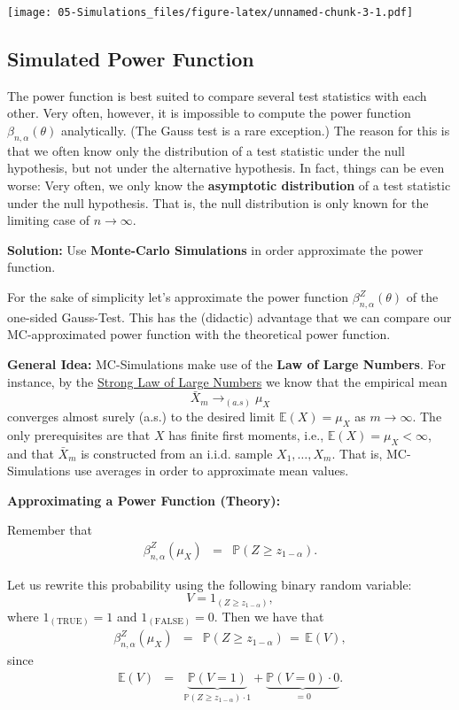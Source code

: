 \documentclass[]{book}
\theoremstyle{definition}
\theoremstyle{definition}
\theoremstyle{definition}
\theoremstyle{remark}
\begin{document}
\texttt{[image: 05-Simulations\_files/figure-latex/unnamed-chunk-3-1.pdf]}

\hypertarget{simulated-power-function}{%
\subsection{Simulated Power Function}\label{simulated-power-function}}

The power function is best suited to compare several test statistics with each other. Very often, however, it is impossible to compute the power function \(\beta_{n,\alpha}(\theta)\) analytically. (The Gauss test is a rare exception.) The reason for this is that we often know only the distribution of a test statistic under the null hypothesis, but not under the alternative hypothesis. In fact, things can be even worse: Very often, we only know the \textbf{asymptotic distribution} of a test statistic under the null hypothesis. That is, the null distribution is only known for the limiting case of \(n\to\infty\).

\textbf{Solution:}
Use \textbf{Monte-Carlo Simulations} in order approximate the power function.

For the sake of simplicity let's approximate the power function \(\beta^Z_{n,\alpha}(\theta)\) of the one-sided Gauss-Test. This has the (didactic) advantage that we can compare our MC-approximated power function with the theoretical power function.

\textbf{General Idea:}
MC-Simulations make use of the \textbf{Law of Large Numbers}. For instance, by the \href{http://www.statlect.com/asylln1.htm}{Strong Law of Large Numbers} we know that the empirical mean
\[\bar{X}_m\to_{(a.s)}\mu_X\]
converges almost surely (a.s.) to the desired limit \(\mathbb{E}(X)=\mu_X\) as \(m\to\infty\). The only prerequisites are that \(X\) has finite first moments, i.e., \(\mathbb{E}(X)=\mu_X<\infty\), and that \(\bar{X}_m\) is constructed from an i.i.d. sample \(X_1,\dots,X_m\). That is, MC-Simulations use averages in order to approximate mean values.

\textbf{Approximating a Power Function (Theory):}

Remember that
\[
\begin{array}{rcl}
\beta^{Z}_{n,\alpha}(\mu_X)
&=&\mathbb{P}(Z \geq z_{1-\alpha}).
\end{array}
\]

Let us rewrite this probability using the following binary random variable:
\[
V=1_{(Z \geq z_{1-\alpha})},
\]
where \(1_{(\text{TRUE})}=1\) and \(1_{(\text{FALSE})}=0\).
Then we have that
\[
\begin{array}{rcl}
\beta^{Z}_{n,\alpha}(\mu_X)
&=&\mathbb{P}(Z \geq z_{1-\alpha})\,=\,\mathbb{E}(V),
\end{array}
\]
since
\[
\begin{array}{rcl}
\mathbb{E}(V)&=&\underbrace{\mathbb{P}(V=1)}_{\mathbb{P}(Z \geq z_{1-\alpha})\cdot 1}+\underbrace{\mathbb{P}(V=0)\cdot 0}_{=0}.%
\end{array}
\]
\end{document}
